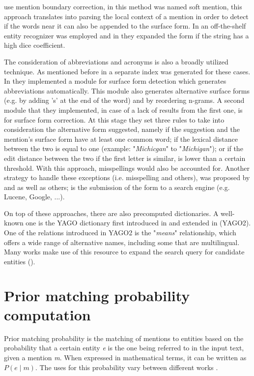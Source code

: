 \cite{Phan2017} use mention boundary correction, in \cite{Lehmann2010LCCAT} this method was named soft mention, this approach translates into parsing the local context of a mention in order to detect if the words near it can also be appended to the surface form. In \cite{Phan2017} an off-the-shelf entity recognizer was employed and in \cite{Lehmann2010LCCAT} they expanded the form if the string has a high dice coefficient.\newline

The consideration of abbreviations and acronyms is also a broadly utilized technique. As mentioned before in \cite{Moussallem2017} a separate index was generated for these cases. In \cite{SFrefinement} they implemented a module for surface form detection which generates abbreviations automatically. This module also generates alternative surface forms (e.g. by adding 's' at the end of the word) and by reordering n-grams. A second module that they implemented, in case of a lack of results from the first one, is for surface form correction. At this stage they set three rules to take into consideration the alternative form suggested, namely if the suggestion and the mention's surface form have at least one common word; if the lexical distance between the two is equal to one (example: "\textit{Michicgan}" to "\textit{Michigan}"); or if the edit distance between the two if the first letter is similar, is lower than a certain threshold. With this approach, misspellings would also be accounted for. Another strategy to handle these exceptions (i.e. misspelling and others), was proposed by \cite{Fang2020} and \cite{Han2009NLPR} as well as others; is the submission of the form to a search engine (e.g. Lucene, Google, ...).\newline

On top of these approaches, there are also precomputed dictionaries. A well-known one is the YAGO dictionary first introduced in \cite{YAGO} and extended in \cite{YAGO2} (YAGO2). One of the relations introduced in YAGO2 is the "\textit{means}" relationship, which offers a wide range of alternative names, including some that are multilingual. Many works make use of this resource to expand the search query for candidate entities (\cite{Sevgili2020}).

\section{Prior matching probability computation}
Prior matching probability is the matching of mentions to entities based on the probability that a certain entity \textit{e} is the one being referred to in the input text, given a mention \textit{m}. When expressed in mathematical terms, it can be written as $P(\textit{e} \mid \textit{m})$. The uses for this probability vary between different works \cite{Sevgili2020}.\newline

